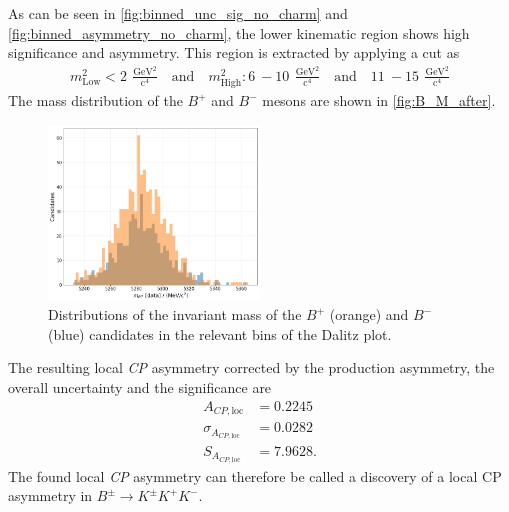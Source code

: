 As can be seen in \autoref{fig:binned_unc_sig_no_charm} and \autoref{fig:binned_asymmetry_no_charm}, the lower kinematic region shows high significance and asymmetry. This region is extracted by applying a cut as 
\begin{align*}
  m^2_{\mathrm{Low}} < \qty{2}{}\, \mathrm{\frac{GeV^2}{c^4}} \quad \mathrm{and} \quad m^2_{\mathrm{High}}: \qty{6}{} - \qty{10}{}\, \mathrm{\frac{GeV^2}{c^4}} \quad \mathrm{and} \quad \qty{11}{} -  \qty{15}{}\, \mathrm{\frac{GeV^2}{c^4}}
\end{align*}
The mass distribution of the $B^+$ and $B^-$ mesons are shown in \autoref{fig:B_M_after}. 
\begin{figure}
  \centering
    \includegraphics[width=0.5\textwidth]{"content/pics/B_M_real_after_p.png"}
     \caption{Distributions of the invariant mass of the $B^+$ (orange) and $B^-$ (blue) candidates in the relevant bins of the Dalitz plot.}
     \label{fig:B_M_after}
\end{figure}
The resulting local \textit{CP} asymmetry
corrected by the production asymmetry, the overall uncertainty and the significance are
\begin{align*}
  A_{CP,\mathrm{loc}} &= 0.2245\\
  \sigma_{A_{CP,\mathrm{loc}}} &= 0.0282 \\ %
  S_{A_{CP,\mathrm{loc}}} &= 7.9628.
\end{align*}
The found local \textit{CP} asymmetry can therefore be called a discovery of a local CP asymmetry in $B^\pm \to K^\pm K^+ K^-$.
